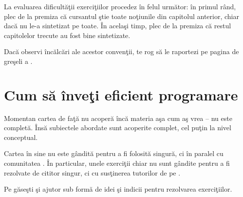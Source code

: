 La evaluarea dificultăţii exerciţiilor procedez în
felul următor: în primul rând, plec de la premiza că
cursantul ştie toate noţiunile din capitolul anterior,
chiar dacă nu le-a sintetizat pe toate. În acelaşi timp,
plec de la premiza că restul capitolelor trecute
au fost bine sintetizate.



Dacă observi încălcări ale acestor convenţii, te rog să le
raportezi pe pagina de greşeli a \phpro.
{}
\section*{Cum să înveţi eficient programare}

Momentan cartea de faţă nu acoperă încă materia aşa cum aş vrea -- nu este completă.
Însă subiectele abordate sunt acoperite complet, cel puţin la nivel conceptual.

Cartea în sine nu este gândită pentru a fi folosită singură, ci
în paralel cu comunitatea \phpro. În particular, unele exerciţii
chiar nu sunt gândite pentru a fi rezolvate de cititor singur,
ci cu susţinerea tutorilor de pe \phpro.

Pe {\phpro} găseşti şi ajutor sub formă de idei şi indicii pentru rezolvarea
exerciţiilor.

